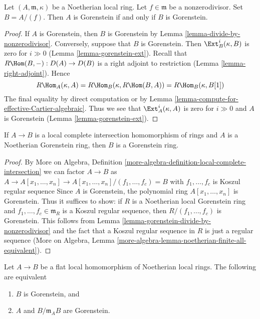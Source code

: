 \begin{lemma}
\label{lemma-gorenstein-divide-by-nonzerodivisor}
Let $(A, \mathfrak m, \kappa)$
be a Noetherian local ring. Let $f \in \mathfrak m$ be a
nonzerodivisor. Set $B = A/(f)$. Then $A$ is Gorenstein if and
only if $B$ is Gorenstein.
\end{lemma}

\begin{proof}
If $A$ is Gorenstein, then $B$ is Gorenstein by
Lemma \ref{lemma-divide-by-nonzerodivisor}.
Conversely, suppose that $B$ is Gorenstein. Then
$\Ext^i_B(\kappa, B)$ is zero for $i \gg 0$
(Lemma \ref{lemma-gorenstein-ext}).
Recall that $R\Hom(B, -) : D(A) \to D(B)$ is a right adjoint
to restriction (Lemma \ref{lemma-right-adjoint}).
Hence
$$
R\Hom_A(\kappa, A) = R\Hom_B(\kappa, R\Hom(B, A)) =
R\Hom_B(\kappa, B[1])
$$
The final equality by direct computation or by
Lemma \ref{lemma-compute-for-effective-Cartier-algebraic}.
Thus we see that $\Ext^i_A(\kappa, A)$ is zero for
$i \gg 0$ and $A$ is Gorenstein (Lemma \ref{lemma-gorenstein-ext}).
\end{proof}

\begin{lemma}
\label{lemma-gorenstein-lci}
If $A \to B$ is a local complete intersection homomorphism of rings and
$A$ is a Noetherian Gorenstein ring, then $B$ is a Gorenstein ring.
\end{lemma}

\begin{proof}
By More on Algebra, Definition
\ref{more-algebra-definition-local-complete-intersection}
we can factor $A \to B$ as
$A \to A[x_1, \ldots, x_n] \to
A[x_1, \ldots, x_n]/(f_1, \ldots, f_c) = B$
with $f_1, \ldots, f_c$ is Koszul regular sequence
Since $A$ is Gorenstein, the polynomial ring
$A[x_1, \ldots, x_n]$ is Gorenstein.
Thus it suffices to show: if $R$ is a Noetherian local
Gorenstein ring and $f_1, \ldots, f_c \in \mathfrak m_R$
is a Koszul regular sequence, then $R/(f_1, \ldots, f_c)$
is Gorenstein. This follows from
Lemma \ref{lemma-gorenstein-divide-by-nonzerodivisor} and
the fact that a Koszul regular sequence in $R$ is just a
regular sequence (More on Algebra, Lemma
\ref{more-algebra-lemma-noetherian-finite-all-equivalent}).
\end{proof}

\begin{lemma}
\label{lemma-flat-under-gorenstein}
Let $A \to B$ be a flat local homomorphism of Noetherian local rings.
The following are equivalent
\begin{enumerate}
\item $B$ is Gorenstein, and
\item $A$ and $B/\mathfrak m_A B$ are Gorenstein.
\end{enumerate}
\end{lemma}

